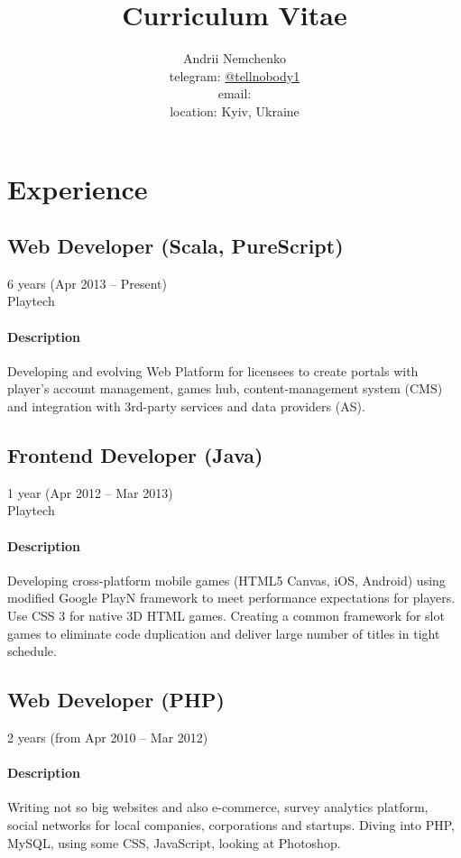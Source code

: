 

\title{Curriculum Vitae}
\author{
  Andrii Nemchenko\\
  telegram: \href{https://t.me/tellnobody1}{@tellnobody1}\\
  email: \\
  location: Kyiv, Ukraine
}
\maketitle
\section{Experience}
\subsection{Web Developer (Scala, PureScript)}
6 years (Apr 2013 – Present)\\
Playtech
\paragraph{Description}
Developing and evolving Web Platform for licensees to create portals with player's account management, games hub, content-management system (CMS) and integration with 3rd-party services and data providers (AS).
\subsection{Frontend Developer (Java)}
1 year (Apr 2012 – Mar 2013)\\Playtech
\paragraph{Description}
Developing cross-platform mobile games (HTML5 Canvas, iOS, Android) using modified Google PlayN framework to meet performance expectations for players. Use CSS 3 for native 3D HTML games. Creating a common framework for slot games to eliminate code duplication and deliver large number of titles in tight schedule.
\subsection{Web Developer (PHP)}
2 years (from Apr 2010 – Mar 2012)
\paragraph{Description}
Writing not so big websites and also e-commerce, survey analytics platform, social networks for local companies, corporations and startups. Diving into PHP, MySQL, using some CSS, JavaScript, looking at Photoshop.

